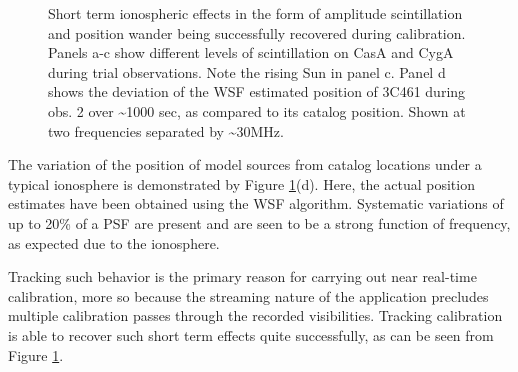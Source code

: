 \documentclass[referee]{aa}
\begin{document}
\begin{figure}[tbh]

\caption{\label{fig:Estimated-flux-of}Short term ionospheric effects in the form
  of amplitude  scintillation and  position wander being  successfully recovered
  during calibration. Panels a-c show  different levels of scintillation on CasA
  and CygA  during trial observations. Note the  rising Sun in panel  c. Panel d
  shows the deviation of the WSF  estimated position of 3C461 during obs. 2 over
  \textasciitilde{}1000 sec, as  compared to its catalog position.  Shown at two
  frequencies separated by \textasciitilde{}30MHz.}
\end{figure}


The variation  of the position of  model sources from catalog  locations under a
typical  ionosphere is  demonstrated  by Figure  \ref{fig:Estimated-flux-of}(d).
Here,  the  actual   position  estimates  have  been  obtained   using  the  WSF
algorithm. Systematic variations of up to 20\% of a PSF are present and are seen
to be a strong function of frequency, as expected due to the ionosphere.

Tracking such  behavior is the primary  reason for carrying  out near real-time
calibration, more so  because the streaming nature of  the application precludes
multiple  calibration   passes  through  the   recorded  visibilities.  Tracking
calibration is  able to recover such  short term effects  quite successfully, as
can be seen from Figure \ref{fig:Estimated-flux-of}.
\end{document}
